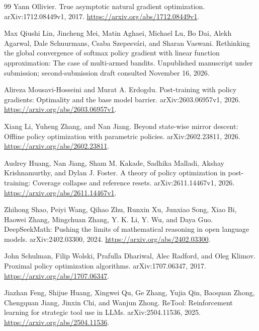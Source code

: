 \documentclass[11pt,twoside]{article}
\theoremstyle{definition}
\theoremstyle{remark}
\begin{document}
\begin{thebibliography}{99}
Yann Ollivier.
\newblock True asymptotic natural gradient optimization.
\newblock arXiv:1712.08449v1, 2017.
\newblock \url{https://arxiv.org/abs/1712.08449v1}.

Max Qiushi Lin, Jincheng Mei, Matin Aghaei, Michael Lu, Bo Dai,
Alekh Agarwal, Dale Schuurmans, Csaba Szepesv\'ari, and Sharan Vaswani.
\newblock Rethinking the global convergence of softmax policy gradient with
linear function approximation: The case of multi-armed bandits.
\newblock Unpublished manuscript under submission; second-submission draft
consulted November 16, 2026.

Alireza Mousavi-Hosseini and Murat A. Erdogdu.
\newblock Post-training with policy gradients: Optimality and the base model barrier.
\newblock arXiv:2603.06957v1, 2026.
\newblock \url{https://arxiv.org/abs/2603.06957v1}.

Xiang Li, Yuheng Zhang, and Nan Jiang.
\newblock Beyond state-wise mirror descent: Offline policy optimization with
parametric policies.
\newblock arXiv:2602.23811, 2026.
\newblock \url{https://arxiv.org/abs/2602.23811}.

Audrey Huang, Nan Jiang, Sham M. Kakade, Sadhika Malladi,
Akshay Krishnamurthy, and Dylan J. Foster.
\newblock A theory of policy optimization in post-training: Coverage collapse
and reference resets.
\newblock arXiv:2611.14467v1, 2026.
\newblock \url{https://arxiv.org/abs/2611.14467v1}.

Zhihong Shao, Peiyi Wang, Qihao Zhu, Runxin Xu, Junxiao Song, Xiao Bi,
Haowei Zhang, Mingchuan Zhang, Y. K. Li, Y. Wu, and Daya Guo.
\newblock DeepSeekMath: Pushing the limits of mathematical reasoning in
open language models.
\newblock arXiv:2402.03300, 2024.
\newblock \url{https://arxiv.org/abs/2402.03300}.

John Schulman, Filip Wolski, Prafulla Dhariwal, Alec Radford, and Oleg Klimov.
\newblock Proximal policy optimization algorithms.
\newblock arXiv:1707.06347, 2017.
\newblock \url{https://arxiv.org/abs/1707.06347}.

Jiazhan Feng, Shijue Huang, Xingwei Qu, Ge Zhang, Yujia Qin,
Baoquan Zhong, Chengquan Jiang, Jinxin Chi, and Wanjun Zhong.
\newblock ReTool: Reinforcement learning for strategic tool use in LLMs.
\newblock arXiv:2504.11536, 2025.
\newblock \url{https://arxiv.org/abs/2504.11536}.


\end{thebibliography}
\end{document}
